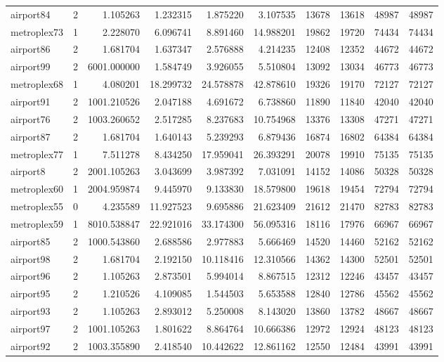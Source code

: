 \begin{longtable}{|l|r|r|r|r|r|r|r|r|r|}
airport84 & 2 & 1.105263 & 1.232315 & 1.875220 & 3.107535 & 13678 & 13618 & 48987 & 48987 \\
metroplex73 & 1 & 2.228070 & 6.096741 & 8.891460 & 14.988201 & 19862 & 19720 & 74434 & 74434 \\
airport86 & 2 & 1.681704 & 1.637347 & 2.576888 & 4.214235 & 12408 & 12352 & 44672 & 44672 \\
airport99 & 2 & 6001.000000 & 1.584749 & 3.926055 & 5.510804 & 13092 & 13034 & 46773 & 46773 \\
metroplex68 & 1 & 4.080201 & 18.299732 & 24.578878 & 42.878610 & 19326 & 19170 & 72127 & 72127 \\
airport91 & 2 & 1001.210526 & 2.047188 & 4.691672 & 6.738860 & 11890 & 11840 & 42040 & 42040 \\
airport76 & 2 & 1003.260652 & 2.517285 & 8.237683 & 10.754968 & 13376 & 13308 & 47271 & 47271 \\
airport87 & 2 & 1.681704 & 1.640143 & 5.239293 & 6.879436 & 16874 & 16802 & 64384 & 64384 \\
metroplex77 & 1 & 7.511278 & 8.434250 & 17.959041 & 26.393291 & 20078 & 19910 & 75135 & 75135 \\
airport8 & 2 & 2001.105263 & 3.043699 & 3.987392 & 7.031091 & 14152 & 14086 & 50328 & 50328 \\
metroplex60 & 1 & 2004.959874 & 9.445970 & 9.133830 & 18.579800 & 19618 & 19454 & 72794 & 72794 \\
metroplex55 & 0 & 4.235589 & 11.927523 & 9.695886 & 21.623409 & 21612 & 21470 & 82783 & 82783 \\
metroplex59 & 1 & 8010.538847 & 22.921016 & 33.174300 & 56.095316 & 18116 & 17976 & 66967 & 66967 \\
airport85 & 2 & 1000.543860 & 2.688586 & 2.977883 & 5.666469 & 14520 & 14460 & 52162 & 52162 \\
airport98 & 2 & 1.681704 & 2.192150 & 10.118416 & 12.310566 & 14362 & 14300 & 52501 & 52501 \\
airport96 & 2 & 1.105263 & 2.873501 & 5.994014 & 8.867515 & 12312 & 12246 & 43457 & 43457 \\
airport95 & 2 & 1.210526 & 4.109085 & 1.544503 & 5.653588 & 12840 & 12786 & 45562 & 45562 \\
airport93 & 2 & 1.105263 & 2.893012 & 5.250008 & 8.143020 & 13860 & 13782 & 48667 & 48667 \\
airport97 & 2 & 1001.105263 & 1.801622 & 8.864764 & 10.666386 & 12972 & 12924 & 48123 & 48123 \\
airport92 & 2 & 1003.355890 & 2.418540 & 10.442622 & 12.861162 & 12550 & 12484 & 43991 & 43991 \\

\end{longtable}
